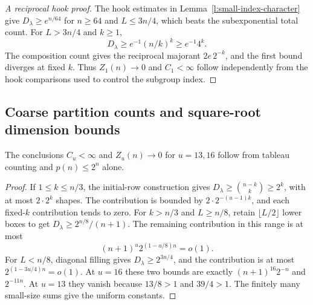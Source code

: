 \begin{proof}[A reciprocal hook proof]
\label{l:degree-small-index-reciprocal}
The hook estimates in Lemma~\ref{l:small-index-character} give
$D_\lambda\ge e^{n/64}$ for $n\ge64$ and $L\le3n/4$,
which beats the subexponential total count. For $L>3n/4$ and $k\ge1$,
\[
 D_\lambda\ge e^{-1}(n/k)^k\ge e^{-1}4^k.
\]
The composition count gives the reciprocal majorant $2e\,2^{-k}$,
and the first bound diverges at fixed $k$. Thus $Z_1(n)\to0$ and
$C_1<\infty$ follow independently from the hook comparisons used
to control the subgroup index.
\end{proof}

\subsection{Coarse partition counts and square-root dimension bounds}
\label{l:degree-square-root-section}

\begin{lemma}
\label{l:degree-elementary-sixteen}
The conclusions $C_u<\infty$ and $Z_u(n)\to0$ for $u=13,16$
follow from tableau counting and $p(n)\le2^n$ alone.
\end{lemma}
\begin{proof}
If $1\le k\le n/3$, the initial-row construction gives
$D_\lambda\ge\binom{n-k}k\ge2^k$, with at most $2\cdot2^k$
shapes.  The contribution is bounded by $2\cdot2^{-(u-1)k}$,
and each fixed-$k$ contribution tends to zero.
For $k>n/3$ and $L\ge n/8$, retain
$\lfloor L/2\rfloor$ lower boxes to get
$D_\lambda\ge2^{n/8}/(n+1)$.
The remaining contribution in this range is at most
\[
 (n+1)^u2^{(1-u/8)n}=o(1).
\]
For $L<n/8$, diagonal filling gives $D_\lambda\ge2^{3n/4}$,
and the contribution is at most $2^{(1-3u/4)n}=o(1)$.
At $u=16$ these two bounds are exactly
$(n+1)^{16}2^{-n}$ and $2^{-11n}$.
At $u=13$ they vanish because $13/8>1$ and $39/4>1$.
The finitely many small-size sums give the uniform constants.
\end{proof}

